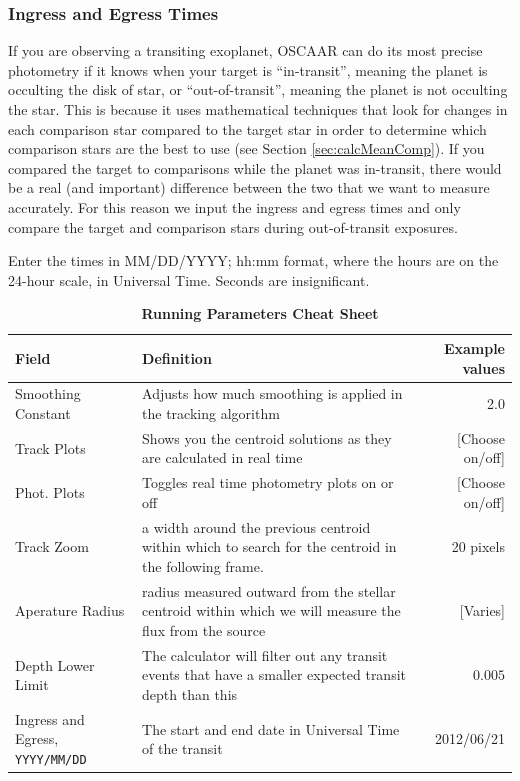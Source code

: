 \documentclass[a4paper]{article}
\newcommand{\code}[1]{\texttt{#1}}
\begin{document}
\subsubsection{Ingress and Egress Times} \label{sec:ingEgr}
If you are observing a transiting exoplanet, OSCAAR can do its most precise photometry if it knows when your target is ``in-transit'', meaning the planet is occulting the disk of star, or ``out-of-transit'', meaning the planet is not occulting the star. This is because it uses mathematical techniques that look for changes in each comparison star compared to the target star in order to determine which comparison stars are the best to use (see Section \ref{sec:calcMeanComp}). If you compared the target to comparisons while the planet was in-transit, there would be a real (and important) difference between the two that we want to measure accurately. For this reason we input the ingress and egress times and only compare the target and comparison stars during out-of-transit exposures.

Enter the times in MM/DD/YYYY;  hh:mm format, where the hours are on the 24-hour scale, in Universal Time. Seconds are insignificant.

\pagebreak
\begin{table}[H]
\renewcommand{\arraystretch}{1.5}
\centering
\caption{\textbf{Running Parameters Cheat Sheet}}
\begin{tabular}{p{0.8in} |  p{3.2in} r}
Field & Definition & Example values\\
\hline\hline
Smoothing Constant & Adjusts how much smoothing is applied in the tracking algorithm & 2.0\\
Track Plots & Shows you the centroid solutions as they are calculated in real time & [Choose on/off]\\
Phot. Plots & Toggles real time photometry plots on or off & [Choose on/off]\\
Track Zoom & a width around the previous centroid within which to search for the centroid in the following frame. &  20 pixels\\
Aperature Radius & radius measured outward from the stellar centroid within which we will measure the flux from the source & [Varies]\\
Depth Lower Limit & The calculator will filter out any transit events that have a smaller expected transit depth than this& $0.005$\\
Ingress and Egress, \code{YYYY/MM/DD} & The start and end date in Universal Time of the transit & 2012/06/21\\
\hline 
\end{tabular}
\end{table}
\end{document}
